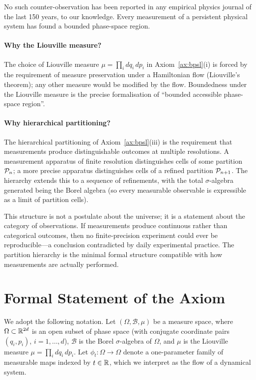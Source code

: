 No such counter-observation has been reported in any empirical physics journal of the last 150 years, to our knowledge. Every measurement of a persistent physical system has found a bounded phase-space region.

\paragraph{Why the Liouville measure?} The choice of Liouville measure $\mu=\prod_{i}dq_{i}\,dp_{i}$ in Axiom~\ref{ax:bpsl}(i) is forced by the requirement of measure preservation under a Hamiltonian flow (Liouville's theorem); any other measure would be modified by the flow. Boundedness under the Liouville measure is the precise formalisation of ``bounded accessible phase-space region''.

\paragraph{Why hierarchical partitioning?} The hierarchical partitioning of Axiom~\ref{ax:bpsl}(iii) is the requirement that measurements produce distinguishable outcomes at multiple resolutions. A measurement apparatus of finite resolution distinguishes cells of some partition $\mathcal{P}_{n}$; a more precise apparatus distinguishes cells of a refined partition $\mathcal{P}_{n+1}$. The hierarchy extends this to a sequence of refinements, with the total $\sigma$-algebra generated being the Borel algebra (so every measurable observable is expressible as a limit of partition cells).

This structure is not a postulate about the universe; it is a statement about the category of observations. If measurements produce continuous rather than categorical outcomes, then no finite-precision experiment could ever be reproducible---a conclusion contradicted by daily experimental practice. The partition hierarchy is the minimal formal structure compatible with how measurements are actually performed.

\section{Formal Statement of the Axiom}
\label{sec:axiom}

We adopt the following notation. Let $(\Omega,\mathcal{B},\mu)$ be a measure space, where $\Omega\subset\mathbb{R}^{2d}$ is an open subset of phase space (with conjugate coordinate pairs $(q_{i},p_{i})$, $i=1,\ldots,d$), $\mathcal{B}$ is the Borel $\sigma$-algebra of $\Omega$, and $\mu$ is the Liouville measure $\mu=\prod_{i}dq_{i}\,dp_{i}$. Let $\phi_{t}\colon\Omega\to\Omega$ denote a one-parameter family of measurable maps indexed by $t\in\mathbb{R}$, which we interpret as the flow of a dynamical system.


